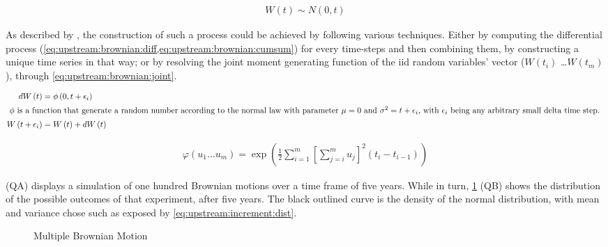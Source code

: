 \documentclass[12pt]{report}
\newcommand{\Bm}{W\left(t\right)}
\begin{document}
\begin{align}
\Bm \sim N(0, t) \label{eq:upstream:brownian:dist}
\end{align}

As described by \citet{shreve}, the construction of such a process could be achieved by following various techniques. Either by computing the differential process (\cref{eq:upstream:brownian:diff,eq:upstream:brownian:cumsum}) for every time-steps and then combining them, by constructing a unique time series in that way; or by resolving the joint moment generating function of the iid random variables' vector ($W(t_i)$ \ldots $W(t_m)$), through \cref{eq:upstream:brownian:joint}.

\begin{align}
  d\Bm &= \phi \left(0, t + \epsilon_i \right) \label{eq:upstream:brownian:diff} \\
  \intertext{
  $\phi$ is a function that generate a random number according to the normal law with parameter $\mu = 0$ and $\sigma^2 = t + \epsilon_i$, with $\epsilon_i$ being any arbitrary small delta time step.
  }
  W\left(t + \epsilon_i\right) &= \Bm + d\Bm \label{eq:upstream:brownian:cumsum}
\end{align}

\begin{align}
  \varphi\left(u_1 \ldots u_m\right) = \exp{\left( \frac{1}{2} \sum_{i = 1}^m \left[ \sum_{j = i}^m u_j \right]^2 \left( t_i - t_{i-1} \right) \right)} \label{eq:upstream:brownian:joint}
\end{align}

 (QA) displays a simulation of one hundred Brownian motions over a time frame of five years. While in turn, \cref{fig:upstream:brownian} (QB) shows the distribution of the possible outcomes of that experiment, after five years. The black outlined curve is the density of the normal distribution, with mean and variance chose such as exposed by \cref{eq:upstream:increment:dist}.

\begin{figure}[H]
\centering

\caption{Multiple Brownian Motion}
\label{fig:upstream:brownian}
\end{figure}
\end{document}

